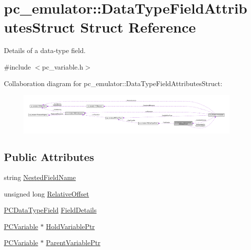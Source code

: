 \hypertarget{structpc__emulator_1_1DataTypeFieldAttributesStruct}{}\section{pc\+\_\+emulator\+:\+:Data\+Type\+Field\+Attributes\+Struct Struct Reference}
\label{structpc__emulator_1_1DataTypeFieldAttributesStruct}


Details of a data-\/type field.  




{\ttfamily \#include $<$pc\+\_\+variable.\+h$>$}



Collaboration diagram for pc\+\_\+emulator\+:\+:Data\+Type\+Field\+Attributes\+Struct\+:
\nopagebreak
\begin{figure}[H]
\begin{center}
\leavevmode
\includegraphics[width=350pt]{structpc__emulator_1_1DataTypeFieldAttributesStruct__coll__graph}
\end{center}
\end{figure}
\subsection*{Public Attributes}
\begin{DoxyCompactItemize}
\item 
string \hyperlink{structpc__emulator_1_1DataTypeFieldAttributesStruct_a38b068714c3b4e3bb59cb5406fbb93f2}{Nested\+Field\+Name}
\item 
unsigned long \hyperlink{structpc__emulator_1_1DataTypeFieldAttributesStruct_a9690def189b94d7515ae0ef00f3470ff}{Relative\+Offset}
\item 
\hyperlink{classpc__emulator_1_1PCDataTypeField}{P\+C\+Data\+Type\+Field} \hyperlink{structpc__emulator_1_1DataTypeFieldAttributesStruct_af464d3e0536e9a2a2e5ad6dfc0e91b1c}{Field\+Details}
\item 
\hyperlink{classpc__emulator_1_1PCVariable}{P\+C\+Variable} $\ast$ \hyperlink{structpc__emulator_1_1DataTypeFieldAttributesStruct_a704592013b2e84005a2f8c0a79e36efe}{Hold\+Variable\+Ptr}
\item 
\hyperlink{classpc__emulator_1_1PCVariable}{P\+C\+Variable} $\ast$ \hyperlink{structpc__emulator_1_1DataTypeFieldAttributesStruct_a8ef95a5a44edd724fc88884d969ee65e}{Parent\+Variable\+Ptr}
\end{DoxyCompactItemize}


